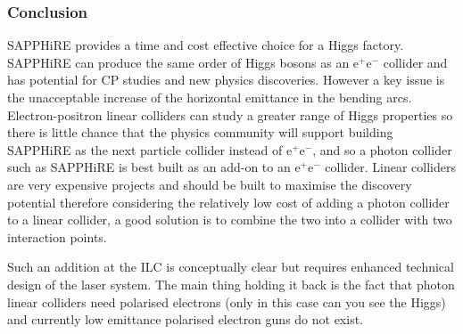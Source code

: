 \subsubsection{Conclusion}
SAPPHiRE provides a time and cost effective choice for a Higgs factory. SAPPHiRE can produce the same order of Higgs bosons as an e$^{+}$e$^{-}$ collider and has potential for CP studies and new physics discoveries. However a key issue is the unacceptable increase of the horizontal emittance in the bending arcs. Electron-positron linear colliders can study a greater range of Higgs properties so there is little chance that the physics community will support building SAPPHiRE as the next particle collider instead of e$^{+}$e$^{-}$, and so a photon collider such as SAPPHiRE is best built as an add-on to an e$^{+}$e$^{-}$  collider. Linear colliders are very expensive projects and should be built to maximise the discovery potential therefore considering the relatively low cost of adding a photon collider to a linear collider, a good solution is to combine the two into a collider with two interaction points.

Such an addition at the ILC is conceptually clear but requires enhanced technical design of the laser system. The main thing holding it back is the fact that photon linear colliders need polarised electrons (only in this case can you see the Higgs) and currently low emittance polarised electron guns do not exist.
